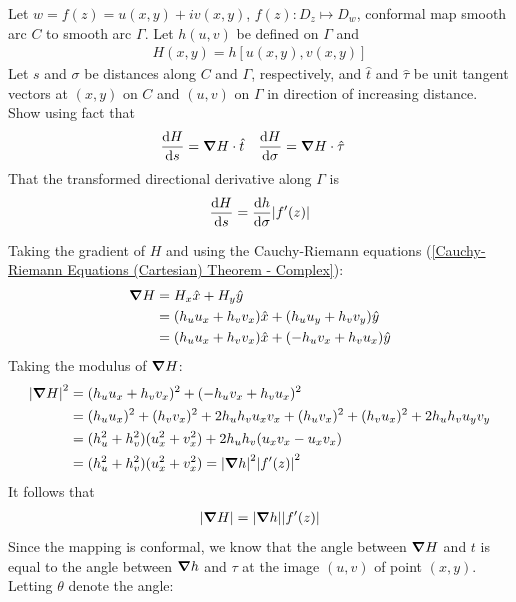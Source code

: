 \documentclass[12pt, english]{book}
\makeatletter
\renewenvironment{proof}[1][\proofname]{\par
	\pushQED{\qed}%
	\normalfont \topsep6\p@\@plus6\p@\relax
	\list{}{%
		\settowidth{\leftmargin}{\itshape\proofname:\hskip\labelsep}%
		\setlength{\labelwidth}{0pt}%
		\setlength{\itemindent}{-\leftmargin}%
		}%
	\item[\hskip\labelsep\itshape#1\@addpunct{:}]\ignorespaces
	}{\popQED\endlist\@endpefalse}
\makeatother
\begin{document}
	\begin{example}
		Let \(w = f(z) = u(x,y) + iv(x,y)\), \(f(z): D_z \mapsto D_w\), conformal map smooth arc \(C\) to smooth arc \(\Gamma\). Let \(h(u,v)\) be defined on \(\Gamma\) and 
		\begin{align*}
			H(x,y) = h[u(x,y), v(x,y)]
		\end{align*}
		Let \(s\) and \(\sigma\) be distances along \(C\) and \(\Gamma\), respectively, and \(\hat{t}\) and \(\hat{\tau}\) be unit tangent vectors at \((x,y)\) on \(C\) and \((u,v)\) on \(\Gamma\) in direction of increasing distance. Show using fact that 
		\begin{align*}
			\dv{H}{s} &= \grad{H} \cdot \hat{t} &
			\dv{H}{\sigma} &= \grad{H} \cdot \hat{\tau}
		\end{align*}
		That the transformed directional derivative along \(\Gamma\) is
		\begin{align*}
			\dv{H}{s} = \dv{h}{\sigma} \abs{f'(z)}
		\end{align*}
		\begin{proof}
			{\color{Grey}
			Taking the gradient of \(H\) and using the Cauchy-Riemann equations (\cref{Cauchy-Riemann Equations (Cartesian) Theorem - Complex}):
			\begin{align*}
				\grad{H} 
				&= H_x \hat{x} + H_y \hat{y} \\
				&= (h_u u_x + h_v v_x) \hat{x} + (h_u u_y + h_v v_y) \hat{y} \\
				&= (h_u u_x + h_v v_x) \hat{x} + (- h_u v_x + h_v u_x) \hat{y}
			\end{align*}
			Taking the modulus of \(\grad{H}\):
			\begin{align*}
				\abs{\grad{H}}^2
				&= (h_u u_x + h_v v_x)^2 + (- h_u v_x + h_v u_x)^2 \\
				&= (h_u u_x)^2 + (h_v v_x)^2 + 2h_u h_v u_x v_x 
					+ (h_u v_x)^2 + (h_v u_x)^2 + 2 h_u h_v u_y v_y \\
				&= (h_u^2 + h_v^2)(u_x^2 + v_x^2) + 2h_u h_v (u_x v_x - u_x v_x) \\
				&= (h_u^2 + h_v^2) (u_x^2 + v_x^2) = \abs{\grad{h}}^2 \abs{f'(z)}^2
			\end{align*}
			It follows that 
			\begin{align*}
				\abs{\grad{H}} = \abs{\grad{h}} \abs{f'(z)}
			\end{align*}
			Since the mapping is conformal, we know that the angle between \(\grad{H}\) and \(t\) is equal to the angle between \(\grad{h}\) and \(\tau\) at the image \((u,v)\) of point \((x,y)\). Letting \(\theta\) denote the angle:
}
\end{proof}
\end{example}
\end{document}
